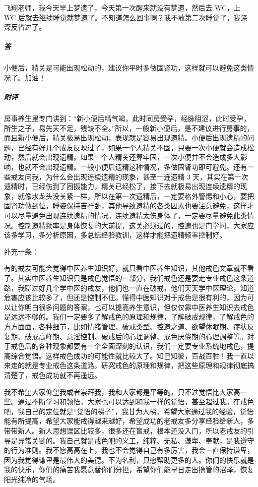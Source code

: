 \begin{case}
    飞翔老师，我今天早上梦遗了，今天第一次醒来就没有梦遗，然后去 WC，上 WC 后就去继续睡觉就梦遗了。不知道怎么回事啊？我不敢第二次睡觉了，我深深反省过了。
    \subparagraph{答} 小便后，精关是可能出现松动的，建议你平时多做固肾功，这样就可以避免这类情况了。加油！
    \subparagraph{附评} 房事养生里专门讲到：“新小便后精气竭，此时同房受孕，经脉阻涩，此时受孕，所生之子，易先天不足，残缺不全。”所以，一般新小便后，是不建议进行房事的，而且新小便后，精关极易出现松动，表现就是容易出现遗精。小便后出现遗精的问题，已经有好几个戒友反映过了，如果一个人精关不固，只要一次小便就会造成松动，然后就会出现遗精。如果一个人精关还算牢固，一次小便并不会造成多大影响，也就不会出现遗精。一般小便后遗精这种情况，多做固肾功即可避免。还有一些戒友问我，为什么会出现连续遗精的现象，甚至一连遗精 3 天，其实在第一次遗精时，已经伤到了固摄能力，精关已经松了，接下去就极易出现连续遗精的现象，就像水龙头没关紧一样，所以在第一次遗精后，一定要格外警惕和小心，要把固肾功做到位，睡姿保持吉祥卧，其他导致遗精的各类因素也要注意避免，这样才可以尽量避免出现连续遗精的情况。连续遗精太伤身体了，一定要尽量避免此类情况。控制遗精频率是身体恢复的大前提，这关必须过的，控遗也是门学问，大家应该多学习，多分析原因，多总结经验教训，这样才能把遗精频率控制好。
\end{case}

补充一条：

有的戒友可能会觉得中医养生知识好，就只看中医养生知识，其他戒色文章就不看了。其实中医养生知识只是戒色觉悟的一部分，我们戒色还是要走专业戒色这条道路，我聊过好几个学中医的戒友，他们也一直在破戒，他们天天学中医理论，知道危害应该比较多了，但还是控制不住。懂得中医知识对于戒色是很有利的，因为可以让你明白很多问题的答案，也可以提高养生意识，但仅仅靠中医养生知识去戒色是远远不够的。我们一定要多了解戒色的原理和规律，了解破戒规律，了解戒色的方方面面，各种细节，比如情绪管理、破戒类型、控遗之道、欲望休眠期、症状反复期、破戒高峰期、意淫控制、破戒后的心理调整、戒色厌倦期的心理调整等。对于戒色后的各种现象都要有一个全面深刻的认识，我们一定要专业系统地戒色，提高综合觉悟。这样戒色成功的可能性就比较大了。知己知彼，百战百胜！我一直以来走的就是专业戒色这条道路，研究戒色的原理和规律，把这些原理和规律彻底搞清楚了，戒色成功就不再遥远。

我不希望大家仰望我或者崇拜我，我和大家都是平等的，只不过觉悟比大家高一些。通过不断学习和领悟，大家也可以达到和我一样的觉悟，甚至超过我。在戒色吧，我自己的定位就是“觉悟的梯子”，我甘为人梯，希望大家通过我的经验，觉悟能有所提高，希望大家能戒得越来越好，希望成功的老戒友多分享经验给新人，多带带新人。新人思想误区比较多，很多还在盲戒，根本还没入门，所以老戒友的引导是异常关键的。我自己就是戒色吧的义工，纯粹、无私、谦卑、奉献，是我遵守的行为准则。我不愿高高在上，我也不会觉得自己有多厉害，我会一直保持谦卑，因为我觉得谦卑是最伟大的美德。不为名利，只愿帮助更多的人。你们的快乐就是我的快乐，你们的痛苦我愿意替你们分担，希望你们能早日走出撸管的沼泽，恢复阳光纯净的气场。

